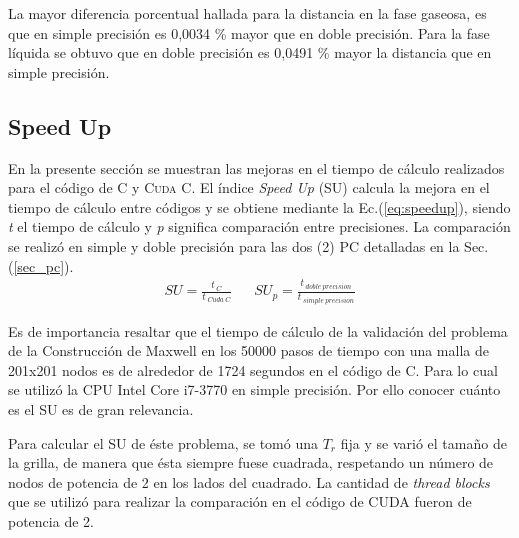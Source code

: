 
La mayor diferencia porcentual hallada para la distancia en la fase gaseosa, es que en simple precisión es 0,0034 \% mayor que en doble precisión. Para la fase líquida se obtuvo que en doble precisión es 0,0491 \% mayor la distancia que en simple precisión.


%

\newpage

\subsection{Speed Up}

En la presente sección se muestran las mejoras en el tiempo de cálculo realizados para el código de \textsc{C} y \textsc{Cuda C}. El índice \textit{Speed Up} (SU) calcula la mejora en el tiempo de cálculo entre códigos y se obtiene mediante la Ec.(\ref{eq:speedup}), siendo \textit{t} el tiempo de cálculo y \textit{p} significa comparación entre precisiones. La comparación se realizó en simple y doble precisión para las dos (2) PC detalladas en la Sec. (\ref{sec_pc}).
\begin{align}
	SU = \frac{t_{\>C}}{t_{\>Cuda \> C}} & & 	{SU}_p = \frac{t_{\>doble \> precision}}{t_{\>simple \> precision}} 
	\label{eq:speedup}
\end{align}

Es de importancia resaltar que el tiempo de cálculo de la validación del problema de la Construcción de Maxwell en los 50000 pasos de tiempo con una malla de 201x201 nodos es de alrededor de 1724 segundos en el código de \textsc{C}. Para lo cual se utilizó la CPU Intel Core i7-3770 en simple precisión. Por ello conocer cuánto es el SU es de gran relevancia.

Para calcular el \textsc{SU} de éste problema, se tomó una $T_r$ fija y se varió el tamaño de la grilla, de manera que ésta siempre fuese cuadrada, respetando un número de nodos de potencia de 2 en los lados del cuadrado. La cantidad de \textit{thread blocks} que se utilizó para realizar la comparación en el código de \textsc{CUDA} fueron de potencia de 2.



